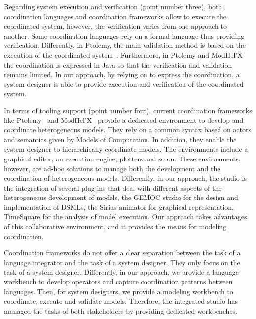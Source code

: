 Regarding system execution and verification (point number three), both coordination languages and coordination frameworks allow to execute the coordinated system, however, the verification varies from one approach to another. Some coordination languages rely on a formal language thus providing verification. Differently, in Ptolemy, the main validation method is based on the execution of the coordinated system~\cite{ptoleframebib}. Furthermore, in Ptolemy and ModHel'X the coordination is expressed in Java so that the verification and validation remains limited. In our approach, by relying on \ccsl to express the coordination, a system designer is able to provide execution and verification of the coordinated system.

In terms of tooling support (point number four), current coordination frameworks like Ptolemy~\cite{ptoleframebib} and ModHel'X~\cite{modhelxbib} provide a dedicated environment to develop and coordinate heterogeneous models. They rely on a common syntax based on actors and semantics given by Models of Computation. In addition, they enable the system designer to hierarchically coordinate models. The environments include a graphical editor, an execution engine, plotters and so on. These environments, however, are ad-hoc solutions to manage both the development and the coordination of heterogeneous models. Differently, in our approach, the studio is the integration of several plug-ins that deal with different aspects of the heterogeneous development of models, \eg the GEMOC studio for the design and implementation of DSMLs, the Sirius animator for graphical representation, TimeSquare for the analysis of model execution. Our approach takes advantages of this collaborative environment, and it provides the means for modeling coordination. 

Coordination frameworks do not offer a clear separation between the task of a language integrator and the task of a system designer. They only focus on the task of a system designer. Differently, in our approach, we provide a language workbench to develop \bcool operators and capture coordination patterns between languages. Then, for system designers, we provide a modeling workbench to coordinate, execute and validate models. Therefore, the integrated studio has managed the tasks of both stakeholders by providing dedicated workbenches. 

